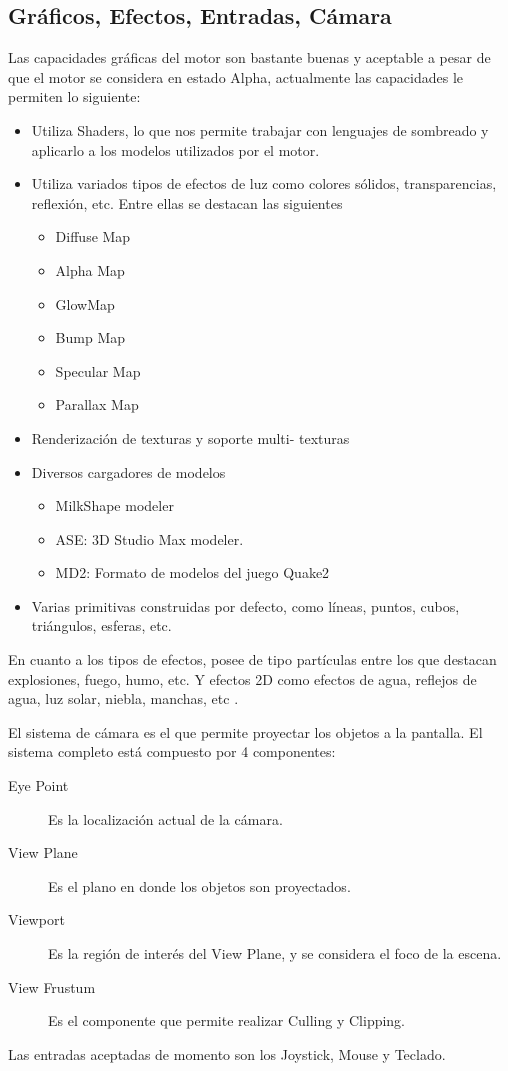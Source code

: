 \documentclass[a4paper,12pt,openany,oneside]{book}
\begin{document}
\subsection{Gráficos, Efectos, Entradas, Cámara}
Las capacidades gráficas del motor son bastante buenas y aceptable a pesar de que el motor se considera en estado Alpha, actualmente las capacidades le permiten lo siguiente:
\begin{itemize}
\item Utiliza Shaders, lo que nos permite trabajar con lenguajes de sombreado y aplicarlo a los modelos utilizados por el motor.
\item Utiliza variados tipos de efectos de luz como colores sólidos, transparencias, reflexión, etc. Entre ellas se destacan las siguientes \cite{JMONKEY} 
\begin{itemize}
\item Diffuse Map
\item Alpha Map
\item GlowMap
\item Bump Map
\item Specular Map
\item Parallax Map
\end{itemize}
\item Renderización de texturas y soporte multi- texturas
\item Diversos cargadores de modelos
\begin{itemize}
\item MilkShape modeler
\item ASE: 3D Studio Max modeler.
\item MD2: Formato de modelos del juego Quake2
\end{itemize}
\item Varias primitivas construidas por defecto, como líneas, puntos, cubos, triángulos, esferas, etc. 
\end{itemize}
En cuanto a los tipos de efectos, posee de tipo partículas entre los que destacan explosiones, fuego, humo, etc. Y efectos 2D como efectos de agua, reflejos de agua, luz solar, niebla, manchas, etc \cite{JMONKEY}. 

El sistema de cámara es el que permite proyectar los objetos a la pantalla. El sistema completo está compuesto por 4 componentes:
\begin{description}
\item[Eye Point] Es la localización actual de la cámara.
\item[View Plane] Es el plano en donde los objetos son proyectados.
\item[Viewport] Es la región de interés del View Plane, y se considera el foco de la escena. 
\item[View Frustum] Es el componente que permite realizar Culling y Clipping. 
\end{description}
Las entradas aceptadas de momento son los Joystick, Mouse y Teclado.
\end{document}
